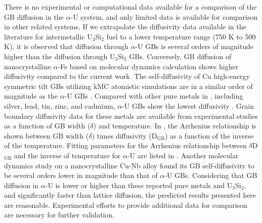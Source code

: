 \documentclass[review]{elsarticle}
\begin{document}

\par There is no experimental or computational data available for a comparison of the GB diffusion in the $\alpha$-U system, and only limited data is available for comparison in other related systems. If we extrapolate the diffusivity data available in the literature for intermetallic U$_\mathrm{3}$Si$_\mathrm{2}$ fuel to a lower temperature range (750 K to 500 K), it is observed that diffusion through $\alpha$-U GBs is several orders of magnitude higher than the diffusion through U$_\mathrm{3}$Si$_\mathrm{2}$ GBs. Conversely, GB diffusion of nanocrystalline $\alpha$-Fe based on molecular dynamics calculation shows higher diffusivity \cite{MOHAMMADZADEH201756} compared to the current work. The self-diffusivity of Cu high-energy symmetric tilt GBs utilizing kMC atomistic simulations are in a similar order of magnitude as the $\alpha$-U GBs \cite{Suzuki2003}. Compared with other pure metals in , including silver, lead, tin, zinc, and cadmium, $\alpha$-U GBs show the lowest diffusivity \cite{diffusion_compare}. Grain boundary diffusivity data for these metals are available from experimental studies as a function of GB width ($\delta$) and temperature. In , the Arrhenius relationship is shown between GB width ($\delta$) times diffusivity (D$_\mathrm{GB}$) as a function of the inverse of the temperature. Fitting parameters for the Arrhenius relationship between $\delta$D$_\mathrm{GB}$ and the inverse of temperature for $\alpha$-U are listed in . Another molecular dynamics study on a nanocrystalline Cu-Nb alloy found its GB self-diffusivity to be several orders lower in magnitude \cite{cu_nb} than that of $\alpha$-U GBs. Considering that GB diffusion in $\alpha$-U is lower or higher than these reported pure metals and U$_3$Si$_2$, and significantly faster than lattice diffusion, the predicted results presented here are reasonable. Experimental efforts to provide additional data for comparison are necessary for further validation. 
\end{document}
